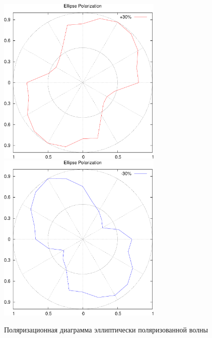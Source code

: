 \documentclass[11pt,a4paper,oneside, reqno]{amsproc}
\begin{document}
\begin{figure}[h!]
    \begin{center}
        \includegraphics[width=0.7\textwidth]{data2-1.pdf}
        \includegraphics[width=0.7\textwidth]{data2-2.pdf}
    \end{center}
    \caption{Поляризационная диаграмма эллиптически поляризованной волны}
    \label{fig:plot2}
\end{figure}
\end{document}
